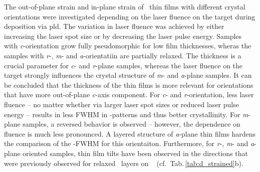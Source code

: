 The out-of-plane strain and in-plane strain of \cro\ thin films with different crystal orientations were investigated depending on the laser fluence on the target during deposition via \gls{pld}.
The variation in laser fluence was achieved by either increasing the laser spot size or by decreasing the laser pulse energy.
Samples with \textit{c}-orientation grow fully pseudomorphic for low film thicknesses, wheras the samples with \textit{r}-, \textit{m}- and \textit{a}-orientatiin are partially relaxed.
The thickness is a crucial parameter for \textit{c}- and \textit{r}-plane samples, whereas the laser fluence on the target strongly influences the crystal structure of \textit{m}- and \textit{a}-plane samples.
It can be concluded that the thickness of the thin films is more relevant for orientations that have more out-of-plane \textit{c}-axis component.
For \textit{c}- and \textit{r}-orientation, less laser fluence -- no matter whether via larger laser spot sizes or reduced laser pulse energy -- results in less \gls{FWHM} in \textomega-patterns and thus better crystallinity.
For \textit{m}-plane samples, a reversed behavior is observed -- however, the dependence on fluence is much less pronounced.
A layered structure of \textit{a}-plane thin films hardens the comparison of the \textomega-FWHM for this orientaiton.
Furthermore, for \textit{r}-, \textit{m}- and \textit{a}-plane oriented samples, thin film tilts have been observed in the directions that were previously observed for relaxed \agao\ layers on \alo\ 
    \cite{grundmann2020b,kneiss2021}
(cf.\ Tab.\,\ref{tab:d_strained}b).

